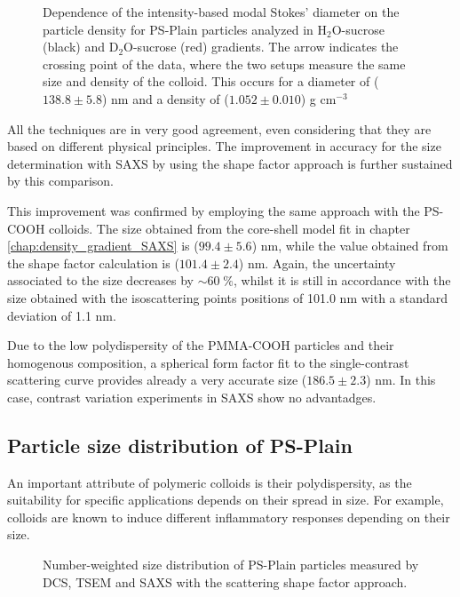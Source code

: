 \begin{figure}
	\begin{center}
		
	\end{center}
	\caption[Simultaneous size and density determination of PS-Plain with a DCS combined approach.]{Dependence of the intensity-based modal Stokes' diameter on the particle density for PS-Plain particles analyzed in H$_2$O-sucrose (black) and D$_2$O-sucrose (red) gradients. The arrow indicates the crossing point of the data, where the two setups measure the same size and density of the colloid. This occurs for a diameter of ($138.8\pm5.8$) nm and a density of ($1.052\pm0.010$) g cm$^{-3}$}
	\label{fig:DCSCombinedStokes}
\end{figure}
 
All the techniques are in very good agreement, even considering that they are based on different physical principles. The improvement in accuracy for the size determination with SAXS by using the shape factor approach is further sustained by this comparison. 

This improvement was confirmed by employing the same approach with the PS-COOH colloids. The size obtained from the core-shell model fit in chapter \ref{chap:density_gradient_SAXS} is ($99.4\pm5.6$) nm, while the value obtained from the shape factor calculation is ($101.4\pm2.4$) nm. Again, the uncertainty associated to the size decreases by $\sim 60\;\%$, whilst it is still in accordance with the size obtained with the isoscattering points positions of 101.0 nm with a standard deviation of 1.1 nm. 

Due to the low polydispersity of the PMMA-COOH particles and their homogenous composition, a spherical form factor fit to the single-contrast scattering curve provides already a very accurate size ($186.5\pm2.3$) nm. In this case, contrast variation experiments in SAXS show no advantadges.

\subsection{Particle size distribution of PS-Plain}

An important attribute of polymeric colloids is their polydispersity, as the suitability for specific applications depends on their spread in size. For example, colloids are known to induce different inflammatory responses depending on their size\citep{kusaka_effect_2014}.

\begin{figure}
	\begin{center}
		
	\end{center}
	\caption[Number-weighted size distribution of PS-Plain particles.]{Number-weighted size distribution of PS-Plain particles measured by DCS, TSEM \citep{nicolet_inter-laboratory_2016} and SAXS with the scattering shape factor approach.}
	\label{fig:PSPlainSizeDistribution}
\end{figure}

